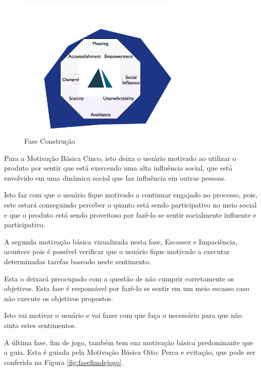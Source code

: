 \begin{figure}[h]
    \centering
    \includegraphics[width=300px, scale=1]{figuras/faseconstrucao}
    \caption{Fase Construção}
    \label{fig:faseconstrucao}
\end{figure}


Para a Motivação Básica Cinco, isto deixa o usuário motivado ao utilizar o produto
por sentir que está exercendo uma alta influência social, que está envolvido em
uma dinâmica social que faz influência em outras pessoas.

Isto faz com que o usuário fique motivado a continuar engajado no processo, pois,
este estará conseguindo perceber o quanto está sendo participativo no meio social
e que o produto está sendo proveitoso por fazê-lo se sentir socialmente influente
e participativo.


A segunda motivação básica vizualizada nesta fase, Escassez e Impaciência, acontece
pois é possível verificar que o usuário fique motivado a executar determinadas
tarefas baseado neste sentimento.

Esta o deixará preocupado com a questão de não cumprir corretamente os objetivos.
Esta fase é responsável por fazê-lo se sentir em um meio escasso caso não execute
os objetivos propostos.

Isto vai motivar o usuário e vai fazer com que faça o necessário para que não
sinta estes sentimentos.

A última fase, fim de jogo, também tem sua motivação básica predominante que
a guia. Esta é guiada pela Motivação Básica Oito: Perca e evitação, que pode
ser conferida na Figura \ref{fig:fasefimdejogo}.

